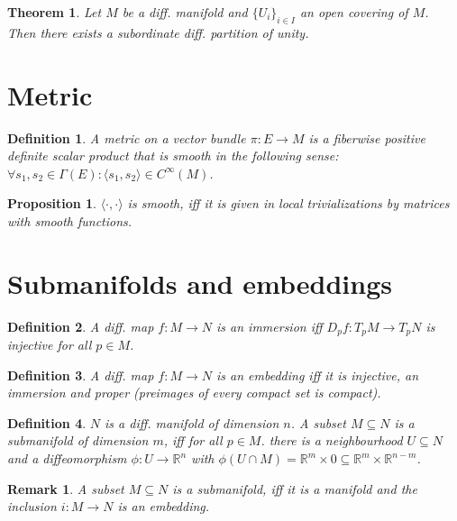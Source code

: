 \documentclass{scrartcl}
\newcommand{\R}{\mathbb R}
\newtheorem*{mydef}{Definition}
\newtheorem*{prop}{Proposition}
\newtheorem*{thm}{Theorem}
\newtheorem*{remark}{Remark}
\begin{document}
\begin{thm}
  Let $M$ be a diff. manifold and $\{U_i\}_{i\in I}$ an open covering of $M$. Then there exists a subordinate diff. partition of unity.
\end{thm}

\section{Metric}

\begin{mydef}
  A \emph{metric} on a vector bundle $\pi:E\rightarrow M$ is a fiberwise positive definite scalar product that is smooth in the following sense: $\forall s_1,s_2\in \Gamma(E): \langle s_1,s_2 \rangle \in C^\infty(M)$.
\end{mydef}

\begin{prop}
  $\langle \cdot, \cdot \rangle$ is smooth, iff it is given in local trivializations by matrices with smooth functions.
\end{prop}

\section{Submanifolds and embeddings}

\begin{mydef}
  A diff. map $f:M\rightarrow N$ is an \emph{immersion} iff $D_p f:T_p M\rightarrow T_p N$ is injective for all $p\in M$.
\end{mydef}

\begin{mydef}
  A diff. map $f:M\rightarrow N$ is an \emph{embedding} iff it is injective, an immersion and proper (preimages of every compact set is compact).
\end{mydef}

\begin{mydef}
  $N$ is a diff. manifold of dimension $n$. A subset $M\subseteq N$ is a submanifold of dimension $m$, iff for all $p\in M$. there is a neighbourhood $U\subseteq N$ and a diffeomorphism $\phi: U \rightarrow \R^n$ with $\phi(U\cap M)=\R^m \times 0 \subseteq \R^m\times\R^{n-m}$.
\end{mydef}

\begin{remark}
  A subset $M\subseteq N$ is a submanifold, iff it is a manifold and the inclusion $i: M\rightarrow N$ is an embedding.
\end{remark}
\end{document}
